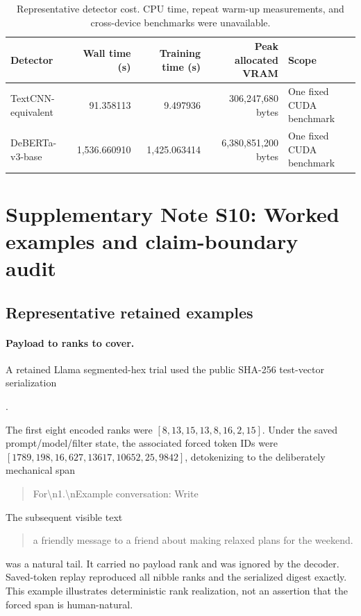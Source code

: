 \documentclass[fleqn,10pt]{wlscirep}
\begin{document}
\begin{table}[H]
\centering
\small
\begin{tabularx}{\textwidth}{L{0.25\textwidth}r r r Y}
\toprule
Detector & Wall time (s) & Training time (s) & Peak allocated VRAM & Scope \\
\midrule
TextCNN-equivalent & 91.358113 & 9.497936 & 306,247,680 bytes & One fixed CUDA benchmark \\
DeBERTa-v3-base & 1,536.660910 & 1,425.063414 & 6,380,851,200 bytes & One fixed CUDA benchmark \\
\bottomrule
\end{tabularx}
\caption{\label{tab:detector-cost}Representative detector cost. CPU time, repeat warm-up measurements, and cross-device benchmarks were unavailable.}
\end{table}

\section*{Supplementary Note S10: Worked examples and claim-boundary audit}\label{si:s10}

\subsection*{Representative retained examples}

\paragraph{Payload to ranks to cover.}
A retained Llama segmented-hex trial used the public SHA-256 test-vector serialization
\begin{center}
.
\end{center}
The first eight encoded ranks were \([8,13,15,13,8,16,2,15]\). Under the saved prompt/model/filter state, the associated forced token IDs were \([1789,198,16,627,13617,10652,25,9842]\), detokenizing to the deliberately mechanical span
\begin{quote}
\ttfamily For\textbackslash n1.\textbackslash nExample conversation: Write
\end{quote}
The subsequent visible text
\begin{quote}
\ttfamily a friendly message to a friend about making relaxed plans for the weekend.
\end{quote}
was a natural tail. It carried no payload rank and was ignored by the decoder. Saved-token replay reproduced all nibble ranks and the serialized digest exactly. This example illustrates deterministic rank realization, not an assertion that the forced span is human-natural.
\end{document}
